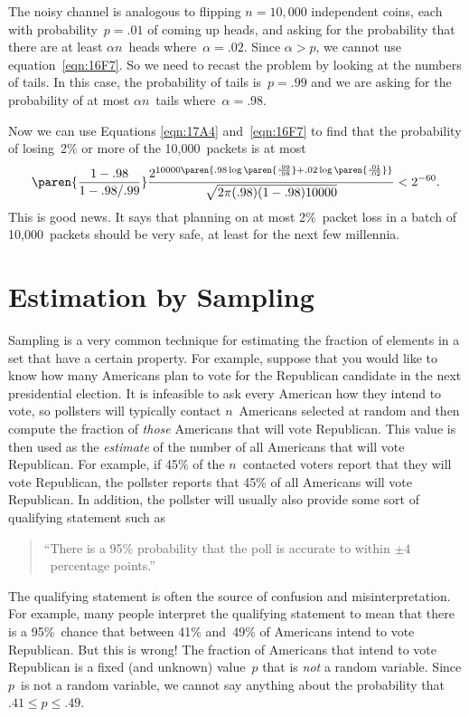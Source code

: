 \begin{editingnotes}
The noisy channel is analogous to flipping $n = 10{,}000$ independent
coins, each with probability~$p = .01$ of coming up heads, and asking
for the probability that there are at least $\alpha n$~heads
where~$\alpha = .02$.  Since $\alpha > p$, we cannot use
equation~\eqref{eqn:16F7}.  So we need to recast the problem by looking
at the numbers of tails.  In this case, the probability of tails is~$p
= .99$ and we are asking for the probability of at most $\alpha
n$~tails where~$\alpha = .98$.

Now we can use Equations \ref{eqn:17A4} and~\ref{eqn:16F7} to find
that the probability of losing~2\% or more of the 10,000~packets is at
most
\begin{equation*}
    \paren{\frac{1 - .98}{1 - .98/.99}}
    \frac{ 2^{10000\paren{.98 \log\paren{\frac{.99}{.98}}
                        + .02 \log\paren{\frac{.01}{.02}}} } }
         {\sqrt{2\pi (.98)(1 - .98) 10000}}
    < 2^{-60}.
\end{equation*}
This is good news.  It says that planning on at most 2\%~packet loss
in a batch of 10,000~packets should be very safe, at least for the
next few millennia.

\section{Estimation by Sampling}\label{sec:sampling}

Sampling is a very common technique for estimating the fraction of
elements in a set that have a certain property.  For example, suppose
that you would like to know how many Americans plan to vote for the
Republican candidate in the next presidential election.  It is
infeasible to ask every American how they intend to vote, so pollsters
will typically contact $n$~Americans selected at random and then
compute the fraction of \emph{those} Americans that will vote
Republican.  This value is then used as the \emph{estimate} of the
number of all Americans that will vote Republican.  For example, if
45\% of the $n$~contacted voters report that they will vote
Republican, the pollster reports that 45\% of all Americans will vote
Republican.  In addition, the pollster will usually also provide some
sort of qualifying statement such as
\begin{quote}
``There is a 95\% probability that the poll is accurate to within $\pm
  4$~percentage points.''
\end{quote}

The qualifying statement is often the source of confusion and
misinterpretation.  For example, many people interpret the qualifying
statement to mean that there is a 95\%~chance that between 41\%
and~49\% of Americans intend to vote Republican.  But this is wrong!
The fraction of Americans that intend to vote Republican is a fixed
(and unknown) value~$p$ that is \emph{not} a random variable.  Since
$p$~is not a random variable, we cannot say anything about the
probability that $.41 \le p \le .49$.


\end{editingnotes}
